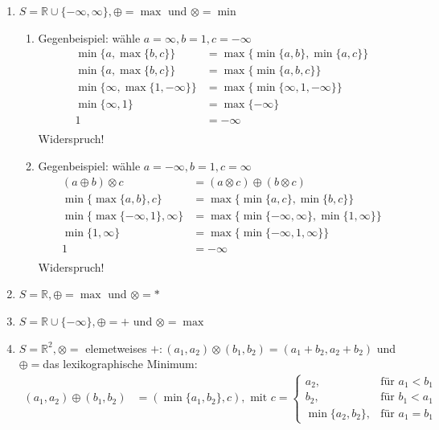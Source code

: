 \documentclass[ngerman,a4paper]{report}
\begin{document}
\begin{enumerate}
\item $S=\mathbb{R} \cup \{-\infty,\infty \}, \oplus = \max$ und $\otimes = \min$\\
\begin{enumerate}
\item Gegenbeispiel: wähle $a = \infty, b = 1, c = -\infty$\begin{align*}
\min\{ a, \max\{b, c \} \} &= \max\{ \min\{ a, b\}, \min\{ a, c\} \}\\
\min\{ a, \max\{b, c \} \} &= \max\{ \min\{ a, b, c\} \}\\
\min\{ \infty, \max\{1, -\infty \} \} &= \max\{ \min\{ \infty, 1, -\infty\} \}\\
\min\{ \infty, 1 \} &= \max\{ -\infty \}\\
1 &= -\infty\\
\end{align*}
Widerspruch!
\item Gegenbeispiel: wähle $a = -\infty, b = 1, c = \infty$\begin{align*}
(a \oplus b) \otimes c &= (a \otimes c) \oplus (b \otimes c)\\
\min\{ \max\{a, b \}, c \} &= \max\{ \min\{ a, c\}, \min\{ b, c\} \}\\
\min\{ \max\{-\infty, 1 \}, \infty \} &= \max\{ \min\{ -\infty, \infty\}, \min\{ 1, \infty\} \}\\
\min\{ 1 , \infty \} &= \max\{ \min\{ -\infty, 1, \infty\} \}\\
1 &= -\infty\\
\end{align*}
Widerspruch!
\end{enumerate}
\item $S=\mathbb{R}, \oplus = \max$ und $\otimes = *$
\item $S=\mathbb{R} \cup \{-\infty\}, \oplus = +$ und $\otimes = \max$
\item $S=\mathbb{R}^2, \otimes=$ elemetweises $+: (a_1,a_2)\otimes(b_1,b_2) = (a_1+b_2,a_2+b_2)$ und $\oplus=$das lexikographische Minimum:
\begin{align*}
(a_1,a_2)\oplus (b_1,b_2) &= (\min\{a_1,b_2\},c), \text{ mit } c = \begin{cases} a_2, &\text{für }a_1 < b_1 \\ b_2, &\text{für }b_1 < a_1 \\ \min\{a_2,b_2\},&\text{für } a_1=b_1\end{cases}
\end{align*}
\end{enumerate}
\end{document}
